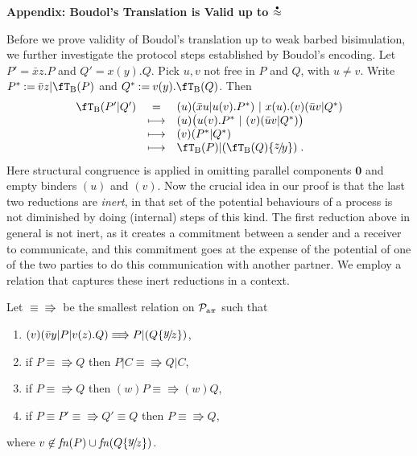 \documentclass[runningheads]{llncs}
\newcommand{\T}{\mathcal{P}}             %
\newcommand{\bbT}{\T}
\newcommand{\fn}{{\it fn}}               %
\newcommand{\subs}[2]{\{\mathord{\raisebox{2pt}[0pt]{$#1$}\!/\!#2}\}} %
\newcommand{\equred}{\mathrel{\equiv}}
\newcommand{\wbb}{\stackrel{\raisebox{-1pt}[0pt][0pt]{$\scriptscriptstyle \bullet$}}{\approx}}
\newcommand{\pima}{{\rm a\pi}}
\newcommand{\sI}{\fT}
\begin{document}

\renewcommand{\doi}[1]{doi:\urlalt{http://dx.doi.org/#1}{#1}}

\vspace{2ex}

\appendix

\renewcommand{\sI}{\fT_{\rm B}}

\noindent
\hypertarget{appendix}{{\large\bf Appendix: Boudol's Translation is Valid up to $\wbb$}}\vspace{3.5ex}

\noindent
Before we prove validity of Boudol's translation up to weak barbed bisimulation, we further investigate the protocol steps established by Boudol's encoding.
Let $P'\mathbin=\bar{x}z.P$ and $Q'\mathbin=x(y).Q$. Pick $u,v$ not free in $P$ and $Q$, with
$u\mathbin{\neq} v$. Write $P^*\mathbin{:=}\bar{v}z | \sI(P)$ and $Q^*\mathbin{:=}v(y).\sI(Q)$. Then
\[\begin{array}{rcl}\sI(P'|Q') &=& (u)(\bar{x}u | u(v).P^*) ~|~ x(u).(v)(\bar{u}v | Q^*)\\
&\longmapsto& (u)\big(u(v).P^* ~|~ (v)(\bar{u}v | Q^*)\big)\\
&\longmapsto& (v)(P^* | Q^*)\\
&\longmapsto& \sI(P) | (\sI(Q)\subs{z}{y})\;.
\end{array}\]
Here structural congruence is applied in omitting parallel components $\bm{0}$ and empty binders
$(u)$ and $(v)$. Now the crucial idea in our proof is that the last two reductions are \emph{inert},
in that set of the potential behaviours of a process is not diminished by doing (internal) steps of
this kind. The first reduction above in general is not inert, as it creates a commitment between a
sender and a receiver to communicate, and this commitment goes at the expense of the potential of
one of the two parties to do this communication with another partner.
We employ a relation that captures these inert reductions in a context.

\newcommand{\XX}{P}
\newcommand{\YY}{Q}
\begin{definition}[\cite{vG18a}]\rm\label{def:cool-rel}
Let $\equiv\!\Rrightarrow$ be the smallest relation on $\bbT_{\pima}$ such that
\begin{enumerate}
\item $(v)(\bar vy | \XX | v(z).\YY) \equiv\!\Rrightarrow \XX|(\YY\subs{y}{z})$,
\item if $\XX \equiv\!\Rrightarrow \YY$ then $\XX|C \equiv\!\Rrightarrow \YY|C$,
\item if $\XX \equiv\!\Rrightarrow \YY$ then $(w) \XX \equiv\!\Rrightarrow (w) \YY$,
\item if $\XX \equred \XX' \equiv\!\Rrightarrow \YY' \equred \YY$ then $\XX \equiv\!\Rrightarrow \YY$,
\end{enumerate}
where
$v \not\in \fn(\XX) \cup \fn(\YY\subs{y}{z})$.
\end{definition}
\end{document}
